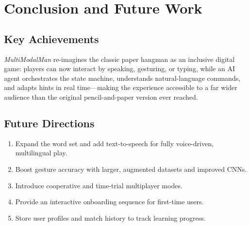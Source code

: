 \section{Conclusion and Future Work}

\subsection{Key Achievements}

\textit{MultiModalMan} re-imagines the classic paper hangman as an inclusive digital game: players can now interact by speaking, gesturing, or typing, while an AI agent orchestrates the state machine, understands natural-language commands, and adapts hints in real time—making the experience accessible to a far wider audience than the original pencil-and-paper version ever reached.

\subsection{Future Directions}
\vspace{-0.5em}
\begin{enumerate}[label=\textbf{F\arabic*}.]
  \item Expand the word set and add text-to-speech for fully voice-driven, multilingual play.
  \item Boost gesture accuracy with larger, augmented datasets and improved CNNs.
  \item Introduce cooperative and time-trial multiplayer modes.
  \item Provide an interactive onboarding sequence for first-time users.
  \item Store user profiles and match history to track learning progress.
\end{enumerate}
